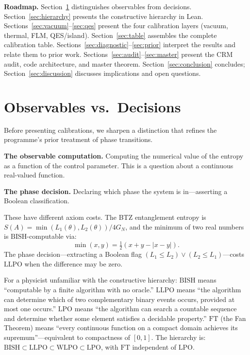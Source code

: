 \documentclass[11pt,a4paper]{article}
\theoremstyle{plain}
\theoremstyle{definition}
\newcommand{\LPO}{\ensuremath{\mathrm{LPO}}}
\newcommand{\LLPO}{\ensuremath{\mathrm{LLPO}}}
\newcommand{\WLPO}{\ensuremath{\mathrm{WLPO}}}
\newcommand{\BISH}{\ensuremath{\mathrm{BISH}}}
\newcommand{\FT}{\ensuremath{\mathrm{FT}}}
\newcommand{\GN}{\ensuremath{G_N}}
\begin{document}
\medskip\noindent
\textbf{Roadmap.}  Section~\ref{sec:obs-vs-dec} distinguishes
observables from decisions.  Section~\ref{sec:hierarchy} presents
the constructive hierarchy in Lean.
Sections~\ref{sec:vacuum}--\ref{sec:qes} present the four
calibration layers (vacuum, thermal, FLM, QES/island).
Section~\ref{sec:table} assembles the complete calibration table.
Sections~\ref{sec:diagnostic}--\ref{sec:prior} interpret the
results and relate them to prior work.
Sections~\ref{sec:audit}--\ref{sec:master} present the CRM audit,
code architecture, and master theorem.
Section~\ref{sec:conclusion} concludes;
Section~\ref{sec:discussion} discusses implications and open
questions.

\section{Observables vs.\ Decisions}\label{sec:obs-vs-dec}

Before presenting calibrations, we sharpen a distinction that
refines the programme's prior treatment of phase transitions.

\textbf{The observable computation.}  Computing the numerical
value of the entropy as a function of the control parameter.
This is a question about a continuous real-valued function.

\textbf{The phase decision.}  Declaring which phase the system
is in---asserting a Boolean classification.

These have different axiom costs.  The BTZ entanglement entropy
is $S(A) = \min(L_1(\theta), L_2(\theta)) / 4\GN$, and the
minimum of two real numbers is $\BISH$-computable via:
\[
  \min(x, y) = \tfrac{1}{2}(x + y - |x - y|).
\]
The phase decision---extracting a Boolean flag
$(L_1 \leq L_2) \lor (L_2 \leq L_1)$---costs $\LLPO$
when the difference may be zero.

For a physicist unfamiliar with the constructive hierarchy:
$\BISH$ means ``computable by a finite algorithm with no oracle.''
$\LLPO$ means ``the algorithm can determine which of two complementary
binary events occurs, provided at most one occurs.''
$\LPO$ means ``the algorithm can search a countable sequence and
determine whether some element satisfies a decidable property.''
$\FT$ (the Fan Theorem) means ``every continuous function on a compact
domain achieves its supremum''---equivalent to compactness of $[0,1]$.
The hierarchy is: $\BISH \subset \LLPO \subset \WLPO \subset \LPO$,
with $\FT$ independent of $\LPO$.
\end{document}
